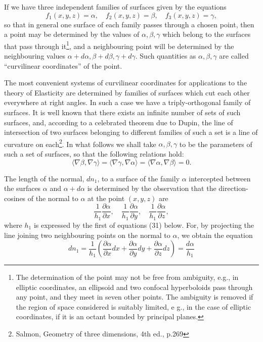 If we have three independent families of surfaces given by the equations
\[f_1(x, y, z)=\alpha, \quad f_2(x, y, z)=\beta, \quad f_3(x, y, z)=\gamma,\]
so that in general one surface of each family passes through a chosen
point, then a point may be determined by the values of
\(\alpha, \beta, \gamma \) which belong to the surfaces that pass through
it\footnote{The determination of the
point may not be free from ambiguity, e.g., in elliptic coordinates, an
ellipsoid and two confocal hyperboloids pass through any point, and they
meet in seven other points. The ambiguity is removed if the region of
space considered is suitably limited, e g., in the case of elliptic
coordinates, if it is an octant bounded by principal planes.},
and a neighbouring point will be determined by the neighbouring values
\(\alpha+d \alpha, \beta+d \beta, \gamma+d \gamma \). Such quantities as
\(\alpha, \beta, \gamma \) are called ``curvilinear coordinates'' of the
point.

The most convenient systems of curvilinear coordinates for applications
to the theory of Elasticity are determined by families of surfaces which
cut each other everywhere at right angles. In such a case we have a
triply-orthogonal family of surfaces. It is well known that there exists
an infinite number of sets of such surfaces, and, according to a
celebrated theorem due to Dupin, the line of intersection of two
surfaces belonging to different families of such a set is a line of
curvature on each\footnote{Salmon, Geometry of three
dimensions, 4th ed., p.269}. In what follows we shall take
\(\alpha, \beta, \gamma \) to be the parameters of such a set of
surfaces, so that the following relations hold:
\[
\langle \nabla \beta, \nabla \gamma \rangle =
\langle \nabla \gamma, \nabla \alpha \rangle =
\langle \nabla \alpha, \nabla \beta \rangle = 0.
\]

The length of the normal, \(d n_1\), to a surface of the family \(\alpha \)
intercepted between the surfaces \(\alpha \) and \(\alpha+d \alpha \) is
determined by the observation that the direction-cosines of the normal
to \(\alpha \) at the point \((x, y, z)\) are
\begin{equation}\label{eq:29}
\frac{1}{h_1} \frac{\partial \alpha}{\partial x}, \quad \frac{1}{h_1}
\frac{\partial \alpha}{\partial y}, \quad \frac{1}{h_1} \frac{\partial
\alpha}{\partial z},
\end{equation}
where \(h_1\) is expressed by the first of equations (31) below. For, by
projecting the line joining two neighbouring points on the normal to
\(\alpha \), we obtain the equation
\begin{equation}\label{eq:30}
d n_1= \frac{1}{h_1}\left(\frac{\partial \alpha}{\partial x} d x+
\frac{\partial \alpha}{\partial y} d y+
\frac{\partial \alpha}{\partial z} d z\right)=\frac{d \alpha}{h_1}
\end{equation}

